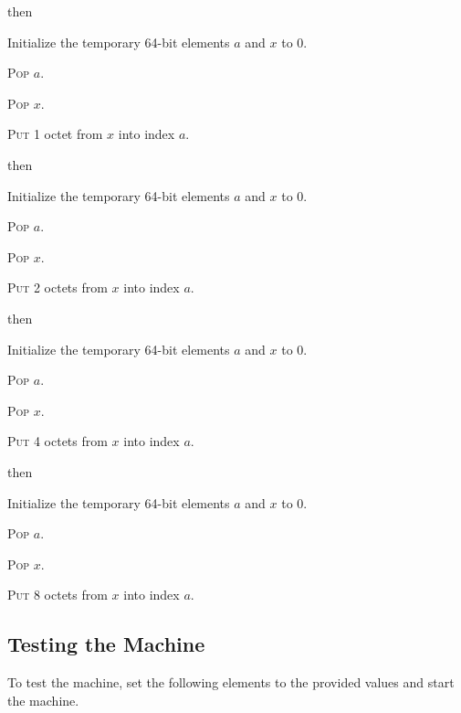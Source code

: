\documentclass[a4paper,12pt]{article}
\newcommand{\num}[1]{\texttt{#1}}
\newcommand{\hex}[1]{\num{#1}_{\textup{\tiny 16}}}
\newcommand{\proc}[1]{\textsc{#1}}
\newcommand{\op}[1]{$#1$}
\newcommand{\STOREB}    [1]{\op{\hex{14}}}
\newcommand{\STORES}    [1]{\op{\hex{15}}}
\newcommand{\STOREI}    [1]{\op{\hex{16}}}
\newcommand{\STOREL}    [1]{\op{\hex{17}}}
\begin{document}
\begin{stepnumbers}[start=3]
\begin{description}
\begin{stepnumbers}
    \end{stepnumbers}
  \item[\STOREB{}] then
    \begin{stepnumbers}
    \item Initialize the temporary 64-bit elements $a$ and $x$ to 0.
    \item \proc{Pop} $a$.
    \item \proc{Pop} $x$.
    \item \proc{Put} 1 octet from $x$ into index $a$.
    \end{stepnumbers}
  \item[\STORES{}] then
    \begin{stepnumbers}
    \item Initialize the temporary 64-bit elements $a$ and $x$ to 0.
    \item \proc{Pop} $a$.
    \item \proc{Pop} $x$.
    \item \proc{Put} 2 octets from $x$ into index $a$.
    \end{stepnumbers}
  \item[\STOREI{}] then
    \begin{stepnumbers}
    \item Initialize the temporary 64-bit elements $a$ and $x$ to 0.
    \item \proc{Pop} $a$.
    \item \proc{Pop} $x$.
    \item \proc{Put} 4 octets from $x$ into index $a$.
    \end{stepnumbers}
  \item[\STOREL{}] then
    \begin{stepnumbers}
    \item Initialize the temporary 64-bit elements $a$ and $x$ to 0.
    \item \proc{Pop} $a$.
    \item \proc{Pop} $x$.
    \item \proc{Put} 8 octets from $x$ into index $a$.
    \end{stepnumbers}
  \end{description}
\end{stepnumbers}

\subsection{Testing the Machine}

To test the machine, set the following elements to the provided values and start the machine.
\end{document}
